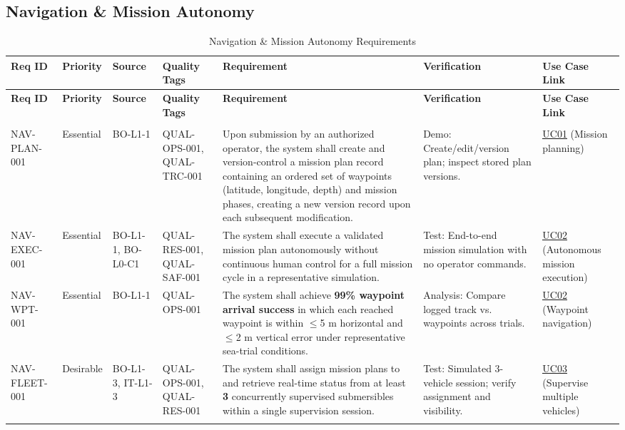 \documentclass[11pt,a4paper]{article}
\let\orighyperref\hyperref
\renewcommand{\hyperref}[2][]{\orighyperref[#1]{\uline{#2}}}%
\begin{document}
\subsection{Navigation \& Mission Autonomy}
\small
\renewcommand{\arraystretch}{1.2}
\setlength{\tabcolsep}{3pt}
\begin{longtable}{|>{\raggedright\arraybackslash}p{}|>{\raggedright\arraybackslash}p{}|>{\raggedright\arraybackslash}p{}|>{\raggedright\arraybackslash}p{}|>{\raggedright\arraybackslash}p{}|>{\raggedright\arraybackslash}p{}|>{\raggedright\arraybackslash}p{}|}
\hline
\rowcolor{tableheader}
\textbf{Req ID} & \textbf{Priority} & \textbf{Source} & \textbf{Quality Tags} & \textbf{Requirement} & \textbf{Verification} & \textbf{Use Case Link} \\
\hline
\endfirsthead
\hline
\rowcolor{tableheader}
\textbf{Req ID} & \textbf{Priority} & \textbf{Source} & \textbf{Quality Tags} & \textbf{Requirement} & \textbf{Verification} & \textbf{Use Case Link} \\
\hline
\endhead
\hline \multicolumn{7}{r}{{Continued on next page}} \\ \hline
\endfoot
\hline
\endlastfoot

NAV-PLAN-001 & Essential & BO-L1-1 & QUAL-OPS-001, QUAL-TRC-001 & Upon submission by an authorized operator, the system shall create and version-control a mission plan record containing an ordered set of waypoints (latitude, longitude, depth) and mission phases, creating a new version record upon each subsequent modification. & Demo: Create/edit/version plan; inspect stored plan versions. & \hyperref[fig:usecase-diagram-pdf]{UC01} (Mission planning) \\
\hline
NAV-EXEC-001 & Essential & BO-L1-1, BO-L0-C1 & QUAL-RES-001, QUAL-SAF-001 & The system shall execute a validated mission plan autonomously without continuous human control for a full mission cycle in a representative simulation. & Test: End-to-end mission simulation with no operator commands. & \hyperref[fig:usecase-diagram-pdf]{UC02} (Autonomous mission execution) \\
\hline
NAV-WPT-001 & Essential & BO-L1-1 & QUAL-OPS-001 & The system shall achieve \textbf{99\% waypoint arrival success} in which each reached waypoint is within \(\leq\)5 m horizontal and \(\leq\)2 m vertical error under representative sea-trial conditions. & Analysis: Compare logged track vs. waypoints across trials. & \hyperref[fig:usecase-diagram-pdf]{UC02} (Waypoint navigation) \\
\hline
NAV-FLEET-001 & Desirable & BO-L1-3, IT-L1-3 & QUAL-OPS-001, QUAL-RES-001 & The system shall assign mission plans to and retrieve real-time status from at least \textbf{3} concurrently supervised submersibles within a single supervision session. & Test: Simulated 3-vehicle session; verify assignment and visibility. & \hyperref[fig:usecase-diagram-pdf]{UC03} (Supervise multiple vehicles) \\
\hline
\caption{Navigation \& Mission Autonomy Requirements}\label{tab:req-navigation}
\end{longtable}
\setlength{\tabcolsep}{6pt}
\normalsize
\end{document}
